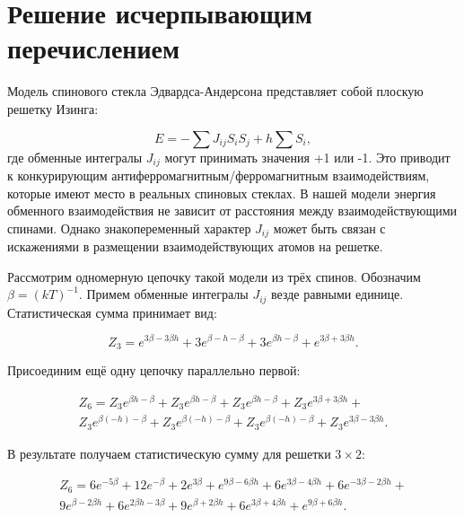 \documentclass[utf8, babel, sor, jor, amsmath, amssymb, reprint]{elsarticle} %
\begin{document}
\section{Решение исчерпывающим перечислением}

Модель спинового стекла Эдвардса-Андерсона представляет собой плоскую решетку Изинга:

\begin{equation}
	E = -\sum J_{ij} S_i S_j + h \sum S_i,
	\label{eq:ising_energy}
\end{equation}
где обменные интегралы $J_{ij}$ могут принимать значения +1 или -1. Это приводит к конкурирующим антиферромагнитным/ферромагнитным взаимодействиям, которые имеют место в реальных спиновых стеклах. В нашей модели энергия обменного взаимодействия не зависит от расстояния между взаимодействующими спинами. Однако знакопеременный характер $J_{ij}$ может быть связан с искажениями в размещении взаимодействующих атомов на решетке.

Рассмотрим одномерную цепочку такой модели из трёх спинов. Обозначим $\beta = (kT)^{-1}$. Примем обменные интегралы $J_{ij}$ везде равными единице. Статистическая сумма принимает вид:

\begin{equation}
	Z_3 = e^{3\beta - 3\beta h} + 3e^{\beta - h - \beta} + 3e^{\beta h - \beta} + e^{3\beta + 3\beta h}.
	\label{eq:stat_3}
\end{equation}

Присоединим ещё одну цепочку параллельно первой:

\begin{equation}
	\label{eq:stat_3_un}
	\begin{alignedat}{2}
		Z_6 = Z_3 e^{\beta  h-\beta }+Z_3 e^{\beta  h-\beta }+Z_3 e^{\beta  h-\beta }+Z_3 e^{3 \beta +3 \beta  h}+ \\
		Z_3 e^{\beta  (-h)-\beta }+Z_3 e^{\beta  (-h)-\beta }+Z_3 e^{\beta  (-h)-\beta }+Z_3 e^{3 \beta -3 \beta  h}.
	\end{alignedat}
\end{equation}

В результате получаем статистическую сумму для решетки $3 \times 2$:

\begin{equation}
	\label{eq:stat_3_res}
	\begin{alignedat}{2}
		Z_6 = 6 e^{-5 \beta }+12 e^{-\beta }+2 e^{3 \beta }+e^{9 \beta -6 \beta  h}+6 e^{3 \beta -4 \beta  h}+6 e^{-3 \beta -2 \beta  h}+\\
		9 e^{\beta -2 \beta  h}+6 e^{2 \beta  h-3 \beta }+9 e^{\beta +2 \beta  h}+6 e^{3 \beta +4 \beta  h}+e^{9 \beta +6 \beta  h}.
	\end{alignedat}
\end{equation}
\end{document}
